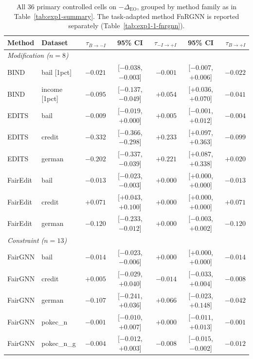 \begin{table}[t]
\centering
\caption{All 36 primary controlled cells on $-\Delta_{\mathrm{EO}}$, grouped by method family as in Table~\ref{tab:exp1-summary}. The task-adapted method FnRGNN is reported separately (Table~\ref{tab:exp1-1-fnrgnn}).}
\label{tab:exp1-cells-negEO}
\vspace{-0.2cm}
\scriptsize
\begin{tabular}{llrcrcr}
\toprule
Method & Dataset & $\tau_{B\rightarrow -I}$ & 95\% CI & $\tau_{-I\rightarrow +I}$ & 95\% CI & $\tau_{B\rightarrow +I}$ \\
\midrule
\multicolumn{7}{l}{\textit{Modification ($n=8$)}} \\
BIND & bail [1pct] & $-0.021$ & [$-0.038$, $-0.003$] & $-0.001$ & [$-0.007$, $+0.006$] & $-0.022$ \\
BIND & income [1pct] & $-0.095$ & [$-0.137$, $-0.049$] & $\mathbf{+0.054}$ & [$+0.036$, $+0.070$] & $-0.041$ \\
\midrule
EDITS & bail & $-0.009$ & [$-0.019$, $+0.000$] & $+0.005$ & [$-0.001$, $+0.012$] & $-0.004$ \\
EDITS & credit & $-0.332$ & [$-0.366$, $-0.298$] & $\mathbf{+0.233}$ & [$+0.097$, $+0.363$] & $-0.099$ \\
EDITS & german & $-0.202$ & [$-0.337$, $-0.039$] & $\mathbf{+0.221}$ & [$+0.087$, $+0.338$] & $+0.020$ \\
\midrule
FairEdit & bail & $-0.013$ & [$-0.023$, $-0.003$] & $+0.000$ & [$+0.000$, $+0.000$] & $-0.013$ \\
FairEdit & credit & $+0.071$ & [$+0.043$, $+0.100$] & $+0.000$ & [$+0.000$, $+0.000$] & $+0.071$ \\
FairEdit & german & $-0.120$ & [$-0.233$, $-0.012$] & $+0.000$ & [$-0.003$, $+0.002$] & $-0.120$ \\
\midrule
\multicolumn{7}{l}{\textit{Constraint ($n=13$)}} \\
FairGNN & bail & $-0.014$ & [$-0.023$, $-0.006$] & $+0.000$ & [$+0.000$, $+0.000$] & $-0.014$ \\
FairGNN & credit & $+0.005$ & [$-0.029$, $+0.040$] & $-0.014$ & [$-0.033$, $+0.004$] & $-0.008$ \\
FairGNN & german & $-0.107$ & [$-0.241$, $+0.036$] & $+0.066$ & [$-0.023$, $+0.148$] & $-0.042$ \\
FairGNN & pokec\_n & $-0.001$ & [$-0.010$, $+0.007$] & $+0.000$ & [$-0.011$, $+0.013$] & $-0.001$ \\
FairGNN & pokec\_n\_g & $-0.004$ & [$-0.012$, $+0.003$] & $-0.008$ & [$-0.015$, $-0.002$] & $-0.012$ \\

\end{tabular}
\end{table}
